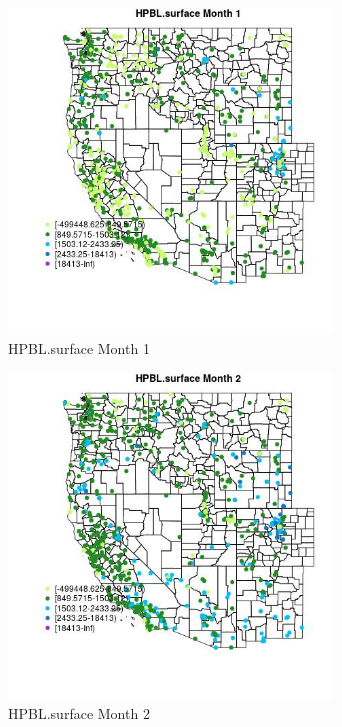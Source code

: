 \begin{figure} 
\centering  
\includegraphics[width=0.77\textwidth]{Code_Outputs/Report_ML_input_PM25_Step4_part_e_de_duplicated_aves_compiled_2019-05-21wNAs_MapObsMo1HPBLsurface.jpg} 
\caption{\label{fig:Report_ML_input_PM25_Step4_part_e_de_duplicated_aves_compiled_2019-05-21wNAsMapObsMo1HPBLsurface}HPBL.surface Month 1} 
\end{figure} 
 

\clearpage 

\begin{figure} 
\centering  
\includegraphics[width=0.77\textwidth]{Code_Outputs/Report_ML_input_PM25_Step4_part_e_de_duplicated_aves_compiled_2019-05-21wNAs_MapObsMo2HPBLsurface.jpg} 
\caption{\label{fig:Report_ML_input_PM25_Step4_part_e_de_duplicated_aves_compiled_2019-05-21wNAsMapObsMo2HPBLsurface}HPBL.surface Month 2} 
\end{figure} 
 

